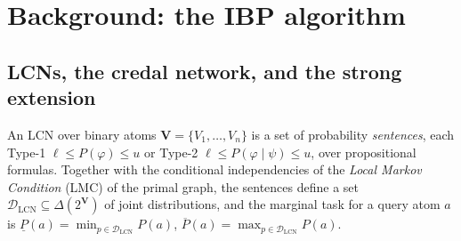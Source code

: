 \documentclass[11pt]{article}
\newcommand{\lo}{\underline}
\newcommand{\hi}{\overline}
\newcommand{\DSE}{\mathcal{D}_{\mathrm{SE}}}
\newcommand{\DLCN}{\mathcal{D}_{\mathrm{LCN}}}
\begin{document}
\begin{abstract}
A \emph{loop} in the factor graph introduces Cartesian-product slack around the feedback and makes it
a strictly \emph{outer} bound on $\DSE$; a cross-family \emph{sentence} makes $\DSE\supsetneq\DLCN$ so
that even an exact $\DSE$ bound is loose on $\DLCN$. One residual limitation: the intersection-based
message algebra cannot perform Bayesian \emph{upward} updates, so IBP does not shift a parent's
posterior given an observed child --- conditional queries with evidence on descendants should use
Credal~VE / \texttt{CredalJT}. \textbf{(iii)~Which tightening schemes apply.} D1/D2/D3 are
\emph{build-stage} knobs on \texttt{CredalNetworkVertices.from\_lcn} that IBP inherits for
\emph{free} (tighter vertices $\Rightarrow$ tighter fixed points). D4 (cross-family coupling)
\emph{is not supported} by IBP --- the \texttt{run} signature has no \texttt{coupling} argument,
because loopy messages cannot carry a global cross-factor constraint; the recommended route is to
absorb such coupling at the build stage (reducing it to Class~1) and accept that whatever remains is
simply not captured. D5 is the separate exact engine \texttt{CredalJT}. With the two message bugs
fixed, IBP is the \emph{fast} member of the family: exact on trees, a valid outer bound over $\DSE$
in general, and the natural cheap complement to Credal~VE for unconditional marginals; for
cross-family coupling or evidence on descendants, use \texttt{CredalJT} (D5).
\end{abstract}

\tableofcontents

\section{Background: the IBP algorithm}\label{sec:bg}

\subsection{LCNs, the credal network, and the strong extension}
An LCN over binary atoms $\mathbf V=\{V_1,\dots,V_n\}$ is a set of probability \emph{sentences},
each Type-1 $\ell\le P(\varphi)\le u$ or Type-2 $\ell\le P(\varphi\mid\psi)\le u$, over
propositional formulas. Together with the conditional independencies of the \emph{Local Markov
Condition} (LMC) of the primal graph, the sentences define a set $\DLCN\subseteq\Delta(2^{\mathbf
V})$ of joint distributions, and the marginal task for a query atom $a$ is $\lo P(a)=\min_{p\in\DLCN}
P(a)$, $\hi P(a)=\max_{p\in\DLCN}P(a)$.
\end{document}
